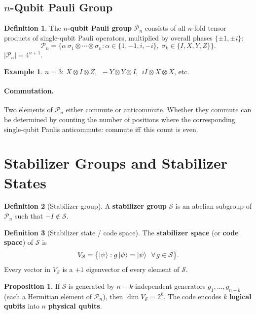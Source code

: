 \documentclass[11pt]{article}
\theoremstyle{definition}
\newtheorem{definition}{Definition}[section]
\newtheorem{example}{Example}[section]
\newtheorem{proposition}{Proposition}[section]
\begin{document}
\subsection{$n$-Qubit Pauli Group}

\begin{definition}
The \textbf{$n$-qubit Pauli group} $\mathcal{P}_n$ consists of all $n$-fold tensor products of single-qubit Pauli operators, multiplied by overall phases $\{\pm 1,\pm i\}$:
\[
    \mathcal{P}_n = \bigl\{\alpha\,\sigma_1\otimes\cdots\otimes\sigma_n : \alpha\in\{1,-1,i,-i\},\;\sigma_k\in\{I,X,Y,Z\}\bigr\}.
\]
$|\mathcal{P}_n|=4^{n+1}$.
\end{definition}

\begin{example}
$n=3$: $X\otimes I\otimes Z$, $\;-Y\otimes Y\otimes I$, $\;iI\otimes X\otimes X$, etc.
\end{example}

\paragraph{Commutation.}  Two elements of $\mathcal{P}_n$ either commute or anticommute.  Whether they commute can be determined by counting the number of positions where the corresponding single-qubit Paulis anticommute: commute iff this count is even.

\section{Stabilizer Groups and Stabilizer States}

\begin{definition}[Stabilizer group]
A \textbf{stabilizer group} $\mathcal{S}$ is an abelian subgroup of $\mathcal{P}_n$ such that $-I\notin\mathcal{S}$.
\end{definition}

\begin{definition}[Stabilizer state / code space]
The \textbf{stabilizer space} (or \textbf{code space}) of $\mathcal{S}$ is
\[
    V_{\mathcal{S}} = \bigl\{\ket{\psi} : g\ket{\psi}=\ket{\psi}\;\;\forall\,g\in\mathcal{S}\bigr\}.
\]
Every vector in $V_{\mathcal{S}}$ is a $+1$ eigenvector of every element of $\mathcal{S}$.
\end{definition}

\begin{proposition}
If $\mathcal{S}$ is generated by $n-k$ independent generators $g_1,\dots,g_{n-k}$ (each a Hermitian element of $\mathcal{P}_n$), then $\dim V_{\mathcal{S}}=2^k$.  The code encodes $k$ \textbf{logical qubits} into $n$ \textbf{physical qubits}.
\end{proposition}
\end{document}
